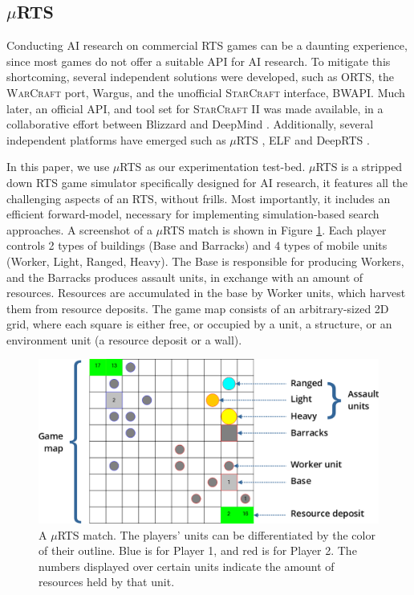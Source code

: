 \documentclass[conference]{IEEEtran}
\newcommand{\mRTS}{$\mu$RTS}
\begin{document}
\subsection{\mRTS{}}

Conducting AI research on commercial RTS games can be a daunting experience, since most games do not offer a suitable API for AI research. To mitigate this shortcoming, several independent solutions were developed, such as ORTS, the \textsc{WarCraft} port, Wargus, and the unofficial \textsc{StarCraft} interface, BWAPI. Much later, an official API, and tool set for \textsc{StarCraft II} was made available, in a collaborative effort between Blizzard and DeepMind \cite{vinyals_starcraft_2017-1}. Additionally, several independent platforms have emerged such as \mRTS{} \cite{ontanon_combinatorial_2013}, ELF \cite{tian_elf_2017} and DeepRTS \cite{andersen_deep_2018}.

In this paper, we use \mRTS{} as our experimentation test-bed. \mRTS{} is a stripped down RTS game simulator specifically designed for AI research, it features all the challenging aspects of an RTS, without frills. Most importantly, it includes an efficient forward-model, necessary for implementing simulation-based search approaches. A screenshot of a \mRTS{} match is shown in Figure \ref{mRTSScreenshot}. Each player controls 2 types of buildings (Base and Barracks) and 4 types of mobile units (Worker, Light, Ranged, Heavy). The Base is responsible for producing Workers, and the Barracks produces assault units, in exchange with an amount of resources. Resources are accumulated in the base by Worker units, which harvest them from resource deposits. The game map consists of an arbitrary-sized 2D grid, where each square is either free, or occupied by a unit, a structure, or an environment unit (a resource deposit or a wall).

\begin{figure}[t]
\begin{center}
	\includegraphics[scale=1]{figs/mRTS.png}
	\caption{A \mRTS{} match. The players' units can be differentiated by the color of their outline. Blue is for Player 1, and red is for Player 2. The numbers displayed over certain units indicate the amount of resources held by that unit. }
	\label{mRTSScreenshot}
\end{center}
\end{figure}
\end{document}
